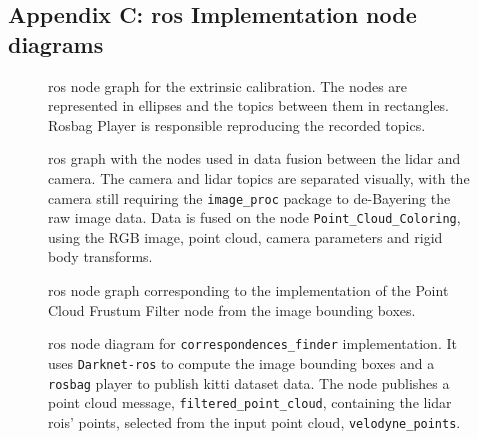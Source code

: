 \begin{landscape}
\section{Appendix C: \ac{ros} Implementation node diagrams} 
\label{appendix:appendix-diagrams}

\begin{figure}[!ht]
	\centering
	\def\svgwidth{\columnwidth}
	\graphicspath{{img/calibration/}}
	
	\caption[\acs{ros} node graph for the extrinsic calibration.]{\ac{ros} node graph for the extrinsic calibration. The nodes are represented in  ellipses and the topics between them in rectangles. Rosbag Player is responsible reproducing the recorded topics.}
	\label{fig:extrinsic-calibration-rosgraph}
\end{figure}

\begin{figure}[!ht]
	\centering
	\def\svgwidth{\columnwidth}
	\graphicspath{{img/sensor_fusion/}}
		
		\caption[\acs{ros} node graph implemented for coloring the point cloud.]{\ac{ros} graph with the nodes used in data fusion between the \ac{lidar} and camera. The camera and \ac{lidar} topics are separated visually, with the camera still requiring the \texttt{image\_proc} package to de-Bayering the raw image data. Data is fused on the node \texttt{Point\_Cloud\_Coloring}, using the RGB image, point cloud, camera parameters and rigid body transforms.}
	\label{fig:sensor-fusion-rosgraph}
\end{figure}


\begin{figure}[!ht] \centering \def\svgwidth{\columnwidth}
	\graphicspath{{img/image-object-to-point-cloud/}}
	 \caption[\ac{ros} node graph for the
	point cloud frustum filter algorithm.]{\ac{ros} node graph corresponding to the implementation of
the Point Cloud Frustum Filter node from the image bounding boxes.} \label{fig:ros-graph-frustum}
\end{figure}


\begin{figure}[!ht]
	\centering
	\def\svgwidth{\columnwidth}
	\graphicspath{{img/image-object-to-point-cloud/}}
		
	\caption[\acs{ros} node diagram for the estimation ob point cloud bounding box from image bounding boxes of objects of interest.]{\ac{ros} node diagram for \texttt{correspondences\_finder} implementation. It uses \texttt{Darknet-ros} to compute the image bounding boxes and a \texttt{rosbag} player to publish \ac{kitti} dataset data. The node publishes a point cloud message, \texttt{filtered\_point\_cloud}, containing the \ac{lidar} \acp{roi}' points, selected from the input point cloud, \texttt{velodyne\_points}.}
	\label{fig:correspondences-finder-standalone}
\end{figure}


\end{landscape}
